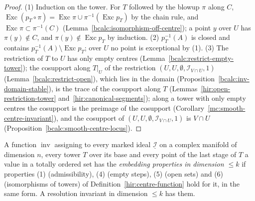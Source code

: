 \begin{proof}
\leanok
(1) Induction on the tower. For \(T\) followed by the blowup \(\pi\) along \(C\), \(\operatorname{Exc}(p_T\circ\pi)=\operatorname{Exc}\pi\cup\pi^{-1}(\operatorname{Exc}p_T)\) by the
chain rule, and \(\operatorname{Exc}\pi\subset\pi^{-1}(C)\) (Lemma~\ref{bcalc:isomorphism-off-centre}); a point \(y\) over \(U\) has \(\pi(y)\notin C\), and
\(\pi(y)\notin\operatorname{Exc}p_T\) by induction. (2) \(p_T^{-1}(A)\) is closed and contains \(p_T^{-1}(A)\setminus\operatorname{Exc}p_T\); over \(U\) no point is
exceptional by (1). (3) The restriction of \(T\) to \(U\) has only empty centres (Lemma~\ref{bcalc:restrict-empty-tower}); the cosupport along \(T|_U\) of the
restriction \((U,U,\emptyset,\mathcal I_{V\cap U},1)\) (Lemma~\ref{bcalc:restrict-open}), which lies in the domain (Proposition~\ref{bcalc:inv-domain-stable}),
is the trace of the cosupport along \(T\) (Lemmas~\ref{hir:open-restriction-tower} and~\ref{hir:canonical-segments}); along a tower with only empty centres
the cosupport is the preimage of the cosupport (Corollary~\ref{mc:smooth-centre-invariant}), and the cosupport of \((U,U,\emptyset,\mathcal I_{V\cap U},1)\)
is \(V\cap U\) (Proposition~\ref{bcalc:smooth-centre-locus}).
\end{proof}

\begin{definition}
\label{mc:embedding-properties}
\leanok
A function \(\operatorname{inv}\) assigning to every marked ideal \(\underline{\mathcal I}\) on a complex manifold of dimension \(n\), every tower \(T\) over its base
and every point of the last stage of \(T\) a value in a totally ordered set has the \emph{embedding properties in dimension \(\le k\)} if properties (1)
(admissibility), (4) (empty steps), (5) (open sets) and (6) (isomorphisms of towers) of Definition~\ref{hir:centre-function} hold for it, in the same form.
A resolution invariant in dimension \(\le k\) has them.
\end{definition}

